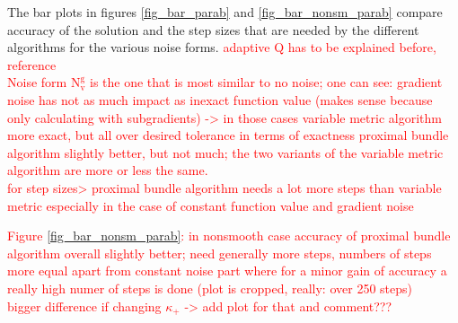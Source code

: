 The bar plots in figures \ref{fig_bar_parab} and \ref{fig_bar_nonsm_parab} compare accuracy of the solution and the step sizes that are needed by the different algorithms for the various noise forms.
\textcolor{red}{adaptive Q has to be explained before, reference}\\
\textcolor{red}{Noise form \(\text{N}_{\text{v}}^{\text{g}}\) is the one that is most similar to no noise; one can see: gradient noise has not as much impact as inexact function value (makes sense because only calculating with subgradients) -> in those cases variable metric algorithm more exact, but all over desired tolerance
in terms of exactness proximal bundle algorithm slightly better, but not much; the two variants of the variable metric algorithm are more or less the same.\\
for step sizes> proximal bundle algorithm needs a lot more steps than variable metric especially in the case of constant function value and gradient noise}

\textcolor{red}{Figure \ref{fig_bar_nonsm_parab}:  in nonsmooth case accuracy of proximal bundle algorithm overall slightly better; need generally more steps, numbers of steps more equal apart from constant noise part where for a minor gain of accuracy a really high numer of steps is done (plot is cropped, really: over 250 steps)\\
bigger difference if changing \(\kappa_+\) -> add plot for that and comment???}

